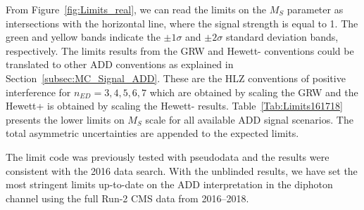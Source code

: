 From Figure~\ref{fig:Limits_real}, we can read the limits on the $M_S$ parameter as intersections with the horizontal line, where the signal strength is equal to 1. The green and yellow bands indicate the $\pm1\sigma$ and $\pm2\sigma$ standard deviation bands, respectively. The limits results from the GRW and Hewett- conventions could be translated to other ADD conventions as explained in Section~\ref{subsec:MC_Signal_ADD}. These are the HLZ conventions of positive interference for $n_{ED}=3,4,5,6,7$ which are obtained by scaling the GRW and the Hewett+ is obtained by scaling the Hewett- results. Table~\ref{Tab:Limits161718} presents the lower limits on $M_S$ scale for all available ADD signal scenarios. The total asymmetric uncertainties are appended to the expected limits.
\begin{table}[pt]
    \centering
    \caption{Full CMS Run II exclusion limits on the mass scale \Ms (in units of {\TeVns}) for various conventions used in the calculation of the ADD large extra-dimensional scenario using the 2016-2018 CMS detector data corresponding to an integrated luminosity of 138 \fbinv.}
    \label{Tab:Limits161718}
\end{table}
The limit code was previously tested with pseudodata and the results were consistent with the 2016 data search. With the unblinded results, we have set the most stringent limits up-to-date on the ADD interpretation in the diphoton channel using the full Run-2 CMS data from 2016--2018.

